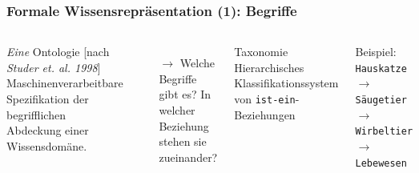 \documentclass[
	ngerman,
	10pt,				%
	aspectratio=169 	%
]{beamer}
\newcommand{\tcblue}[1]{\textcolor{blue}{#1}} %
\begin{document}

\begin{frame}[label=wr2]
  \frametitle{\large Formale Wissensrepräsentation (1): Begriffe}
  
\begin{columns}



\begin{block}{\textit{Eine} Ontologie [nach \textit{Studer et. al. 1998}]}
Maschinenverarbeitbare Spezifikation der begrifflichen Abdeckung einer Wissensdomäne.
\end{block}


\begin{itemize}
 \item[$\rightarrow$] Welche Begriffe gibt es? In welcher Beziehung stehen sie zueinander?
\end{itemize}

\pause

\begin{block}{Taxonomie}
Hierarchisches Klassifikationssystem von \texttt{ist-ein}-Beziehungen\\
\end{block}

\bigskip

 Beispiel: \texttt{Hauskatze} $\rightarrow$ \texttt{Säugetier} $\rightarrow$ \texttt{Wirbeltier} $\rightarrow$ \texttt{Lebewesen}

\end{columns}  



\end{frame}

\end{document}
